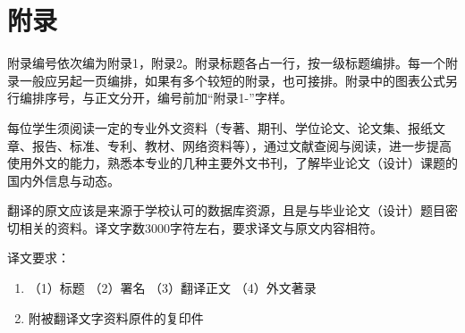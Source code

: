 \chapter{附录}
附录编号依次编为附录1，附录2。附录标题各占一行，按一级标题编排。每一个附录一般应另起一页编排，如果有多个较短的附录，也可接排。附录中的图表公式另行编排序号，与正文分开，编号前加“附录1-”字样。

 每位学生须阅读一定的专业外文资料（专著、期刊、学位论文、论文集、报纸文章、报告、标准、专利、教材、网络资料等），通过文献查阅与阅读，进一步提高使用外文的能力，熟悉本专业的几种主要外文书刊，了解毕业论文（设计）课题的国内外信息与动态。

 翻译的原文应该是来源于学校认可的数据库资源，且是与毕业论文（设计）题目密切相关的资料。译文字数3000字符左右，要求译文与原文内容相符。

 译文要求：
 \begin{enumerate}
 	\item （1）标题 （2）署名 （3）翻译正文 （4）外文著录
 	\item 附被翻译文字资料原件的复印件
 \end{enumerate}
